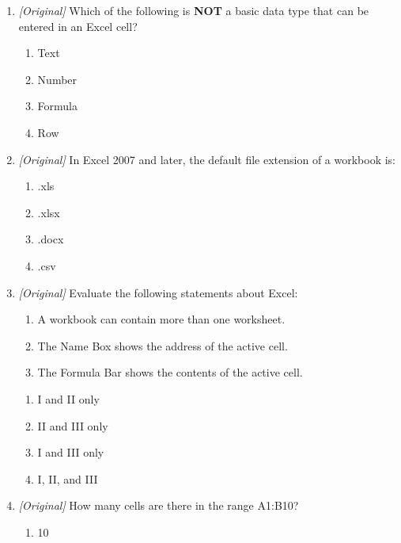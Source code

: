 \begin{enumerate}[label=\textbf{Q\arabic*.}, leftmargin=*]
  \underline{\hspace{1.6cm}}.
  \begin{enumerate}[label=\Alph*.]
    \item right; left
    \item left; right
    \item centre; left
    \item left; centre
  \end{enumerate}
\item \textit{[Original]} Which of the following is \textbf{NOT} a basic data
  type that can be entered in an Excel cell?
  \begin{enumerate}[label=\Alph*.]
    \item Text
    \item Number
    \item Formula
    \item Row
  \end{enumerate}
\item \textit{[Original]} In Excel 2007 and later, the default file extension
  of a workbook is:
  \begin{enumerate}[label=\Alph*.]
    \item .xls
    \item .xlsx
    \item .docx
    \item .csv
  \end{enumerate}
\item \textit{[Original]} Evaluate the following statements about Excel:
  \begin{enumerate}[label=\Roman*.]
    \item A workbook can contain more than one worksheet.
    \item The Name Box shows the address of the active cell.
    \item The Formula Bar shows the contents of the active cell.
  \end{enumerate}
  \begin{enumerate}[label=\Alph*.]
    \item I and II only
    \item II and III only
    \item I and III only
    \item I, II, and III
  \end{enumerate}
\item \textit{[Original]} How many cells are there in the range A1:B10?
  \begin{enumerate}[label=\Alph*.]
    \item 10

\end{enumerate}
\end{enumerate}
